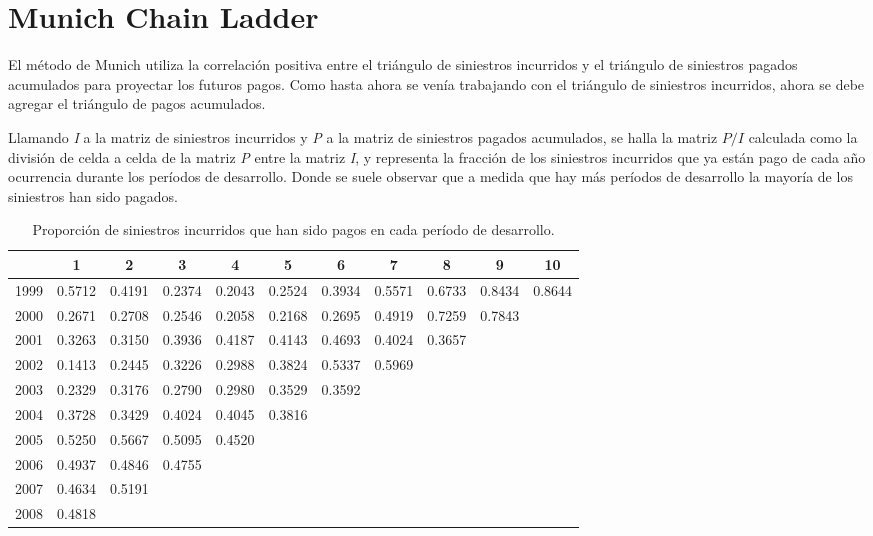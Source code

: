 \documentclass[
  12pt,
]{article}
\begin{document}
\newpage

\section{Munich Chain Ladder}\label{munich-chain-ladder}

El método de Munich utiliza la correlación positiva entre el triángulo
de siniestros incurridos y el triángulo de siniestros pagados acumulados
para proyectar los futuros pagos. Como hasta ahora se venía trabajando
con el triángulo de siniestros incurridos, ahora se debe agregar el
triángulo de pagos acumulados.

Llamando \emph{I} a la matriz de siniestros incurridos y \emph{P} a la
matriz de siniestros pagados acumulados, se halla la matriz \(P/I\)
calculada como la división de celda a celda de la matriz \emph{P} entre
la matriz \emph{I}, y representa la fracción de los siniestros
incurridos que ya están pago de cada año ocurrencia durante los períodos
de desarrollo. Donde se suele observar que a medida que hay más períodos
de desarrollo la mayoría de los siniestros han sido pagados.

\begin{table}[ht]
\centering
\caption{Proporción de siniestros incurridos que han sido pagos en cada período de desarrollo.} 
\label{tabla2}
\begingroup\fontsize{11.5pt}{10pt}\selectfont
\begin{tabular}{ccccccccccc}
  \hline
 & 1 & 2 & 3 & 4 & 5 & 6 & 7 & 8 & 9 & 10 \\ 
  \hline
1999 & 0.5712 & 0.4191 & 0.2374 & 0.2043 & 0.2524 & 0.3934 & 0.5571 & 0.6733 & 0.8434 & 0.8644 \\ 
  2000 & 0.2671 & 0.2708 & 0.2546 & 0.2058 & 0.2168 & 0.2695 & 0.4919 & 0.7259 & 0.7843 &  \\ 
  2001 & 0.3263 & 0.3150 & 0.3936 & 0.4187 & 0.4143 & 0.4693 & 0.4024 & 0.3657 &  &  \\ 
  2002 & 0.1413 & 0.2445 & 0.3226 & 0.2988 & 0.3824 & 0.5337 & 0.5969 &  &  &  \\ 
  2003 & 0.2329 & 0.3176 & 0.2790 & 0.2980 & 0.3529 & 0.3592 &  &  &  &  \\ 
  2004 & 0.3728 & 0.3429 & 0.4024 & 0.4045 & 0.3816 &  &  &  &  &  \\ 
  2005 & 0.5250 & 0.5667 & 0.5095 & 0.4520 &  &  &  &  &  &  \\ 
  2006 & 0.4937 & 0.4846 & 0.4755 &  &  &  &  &  &  &  \\ 
  2007 & 0.4634 & 0.5191 &  &  &  &  &  &  &  &  \\ 
  2008 & 0.4818 &  &  &  &  &  &  &  &  &  \\ 
   \hline
\end{tabular}
\endgroup
\end{table}
\end{document}
